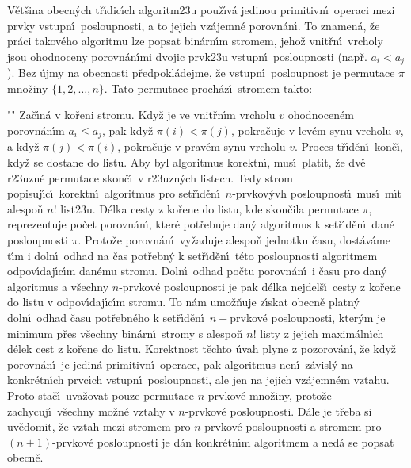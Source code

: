 \flushpar V\v et\v sina obecn\'ych t\v r\'\i dic\'\i ch algoritm\accent23u 
pou\v z\'\i v\'a jedinou primitivn\'\i\ operaci mezi prvky vstupn\'\i\ 
posloupnosti, a to jejich vz\'a\-jemn\'e porov\-n\'an\'\i .  
To znamen\'a, \v ze pr\'aci 
takov\'eho algoritmu lze po\-psat 
bin\'arn\'\i m stro\-mem, jeho\v z vnit\v rn\'\i\ vrcholy jsou ohodnoceny 
porovn\'an\'\i mi dvojic prvk\accent23u vstupn\'\i\ posloupnosti 
(nap\v r. $a_i<a_j$). Bez \'ujmy na obecnosti p\v redpokl\'adejme, \v ze 
vstupn\'\i\ posloupnost je permutace $\pi$
mno\v ziny $\{1,2,\dots,n\}$. Tato permutace proch\'az\'\i\ 
stromem takto:
\roster
\item"{}"
Za\v c\'\i n\'a v ko\v reni stromu. Kdy\v z je ve vnit\v rn\'\i m vrcholu $
v$ 
ohodnocen\'em porovn\'an\'\i m $a_i\le a_j$, pak kdy\v z $\pi (i)
<\pi (j)$, 
pokra\v cuje v lev\'em synu vrcholu $v$, a kdy\v z $\pi (j)<\pi (
i)$, 
pokra\v cuje v prav\'em synu vrcholu $v$. Proces 
t\v r\'\i d\v en\'\i\ kon\v c\'\i , kdy\v z se dostane do listu.
\endroster
Aby byl algoritmus korektn\'\i , mus\'\i\ platit, \v ze dv\v e 
r\accent23uzn\'e permutace skon\v c\'\i\ v r\accent23uzn\'ych 
listech.  Tedy strom popisuj\'\i c\'\i\ korektn\'\i\ algoritmus 
pro set\v r\'\i d\v en\'\i\ $n$-prvkov\'yvh posloupnost\'\i\ mus\'\i\ m\'\i t 
alespo\v n $n!$ list\accent23u.  D\'elka cesty z ko\v rene do listu, 
kde skon\v cila permutace $\pi$, reprezentuje po\v cet porovn\'an\'\i , kter\'e pot\v rebuje 
dan\'y algoritmus k set\v r\'\i d\v en\'\i\ dan\'e posloupnosti $
\pi$. Proto\v ze porovn\'an\'\i\ 
vy\v zaduje alespo\v n jednotku \v casu, dost\'av\'ame t\'\i m i doln\'\i\ odhad na 
\v cas pot\v rebn\'y k set\v r\'\i d\v en\'\i\ t\'eto posloupnosti  algoritmem 
odpov\'\i daj\'\i c\'\i m dan\'emu stromu. Doln\'\i\ odhad  po\v ctu 
porovn\'an\'\i\ i \v casu pro dan\'y algoritmus a v\v sechny  
$n$-prvkov\'e posloupnosti je pak d\'elka nejdel\v s\'\i\ cesty z ko\v rene 
do listu v odpov\'\i daj\'\i c\'\i m stromu. To n\'am umo\v z\v nuje 
z\'\i skat obecn\v e platn\'y doln\'\i\ odhad \v casu pot\v rebn\'eho k set\v r\'\i d\v en\'\i\ 
$n-$prvkov\'e posloupnosti, kter\'ym je  
minimum p\v res v\v sechny bin\'arn\'\i\ stromy s alespo\v n $n!$ 
listy z jejich maxim\'aln\'\i ch d\'elek cest z ko\v rene do listu. 
Korekt\-nost t\v echto \'uvah plyne z pozorov\'an\'\i , 
\v ze kdy\v z porovn\'an\'\i\ je jedin\'a primi\-tivn\'\i\ operace, pak 
algoritmus nen\'\i\ z\'avisl\'y na konkr\'etn\'\i ch prvc\'\i ch vstup\-n\'\i\ 
posloupnosti, ale jen na jejich vz\'ajemn\'em vzta\-hu. 
Proto sta\v c\'\i\ uva\v zovat pouze permutace $n$-prvkov\'e mno\v ziny, 
proto\v ze za\-chycuj\'\i\ v\v sechny mo\v zn\'e vztahy v $n$-prvkov\'e 
posloupnosti. D\'a\-le je t\v reba si uv\v edomit, \v ze vztah mezi 
stromem pro $n$-prvkov\'e posloupnosti a stromem pro 
$(n+1)$-prvkov\'e posloupnosti je d\'an konkr\'etn\'\i m algoritmem a 
ned\'a se popsat obecn\v e. 
\medskip

